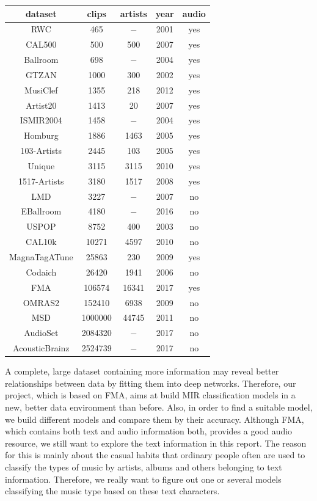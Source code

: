 \documentclass{article}
\begin{document}
\begin{tabular}{*{5}{c}} \hline
dataset & clips & artists & year & audio \\ \hline
RWC & 465 & $-$ & 2001 & yes \\
CAL500 & 500 & 500 & 2007 & yes \\
Ballroom&  698& $-$ & 2004 & yes \\
GTZAN&  1000& 300 & 2002 & yes \\
MusiClef&  1355&  218 & 2012 & yes \\
Artist20&  1413& 20 &  2007&  yes \\
ISMIR2004&  1458 &  $-$ & 2004 & yes  \\
Homburg& 1886 & 1463 & 2005 & yes \\
103-Artists & 2445 & 103 & 2005 & yes \\  
Unique& 3115 & 3115 & 2010 & yes \\
1517-Artists& 3180 & 1517 & 2008 & yes \\
LMD& 3227 & $-$ & 2007 & no \\
EBallroom& 4180 & $-$ & 2016 & no\\ 
USPOP&8752  & 400 & 2003 & no \\
CAL10k& 10271 & 4597 & 2010 & no \\
MagnaTagATune& 25863 & 230 & 2009 & yes \\
Codaich& 26420 & 1941 & 2006 & no \\
FMA& 106574 & 16341 & 2017 & yes \\
OMRAS2 & 152410 & 6938 & 2009 & no \\
MSD& 1000000 & 44745 & 2011 & no \\
AudioSet& 2084320 & $-$ & 2017 & no \\
AcousticBrainz& 2524739 & $-$ & 2017 & no \\ 
\end{tabular}

A complete, large dataset containing more information may reveal better relationships between data by fitting them into deep networks. Therefore, our project, which is based on FMA, aims at build MIR classification models in a new, better data environment than before. Also, in order to find a suitable model, we build different models and compare them by their accuracy. Although FMA, which contains both text and audio information both, provides a good audio resource, we still want to explore the text information in this report. The reason for this is mainly about the casual habits that ordinary people often are used to classify the types of music by artists, albums and others belonging to text information. Therefore, we really want to figure out one or several models classifying the music type based on these text characters.
\end{document}
